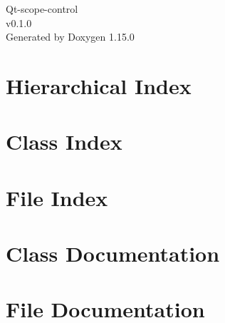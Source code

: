 \documentclass[twoside]{book}
\newcommand{\+}{\discretionary{\mbox{\scriptsize$\hookleftarrow$}}{}{}}
\newcommand{\clearemptydoublepage}{%
    \newpage{\pagestyle{empty}\cleardoublepage}%
  }
\begin{document}
  \raggedbottom
    \hypersetup{pageanchor=false,
                bookmarksnumbered=true,
                pdfencoding=unicode
               }
  \begin{titlepage}
  \vspace*{7cm}
  \begin{center}%
  {\Large Qt-\/scope-\/control}\\
  [1ex]\large v0.\+1.\+0 \\
  \vspace*{1cm}
  {\large Generated by Doxygen 1.15.0}\\
  \end{center}
  \end{titlepage}
  \clearemptydoublepage
  \tableofcontents
  \clearemptydoublepage
  \hypersetup{pageanchor=true}

\chapter{Hierarchical Index}

\chapter{Class Index}

\chapter{File Index}

\chapter{Class Documentation}




\chapter{File Documentation}




  \backmatter
  \newpage
  \clearemptydoublepage
  \printindex
\end{document}
